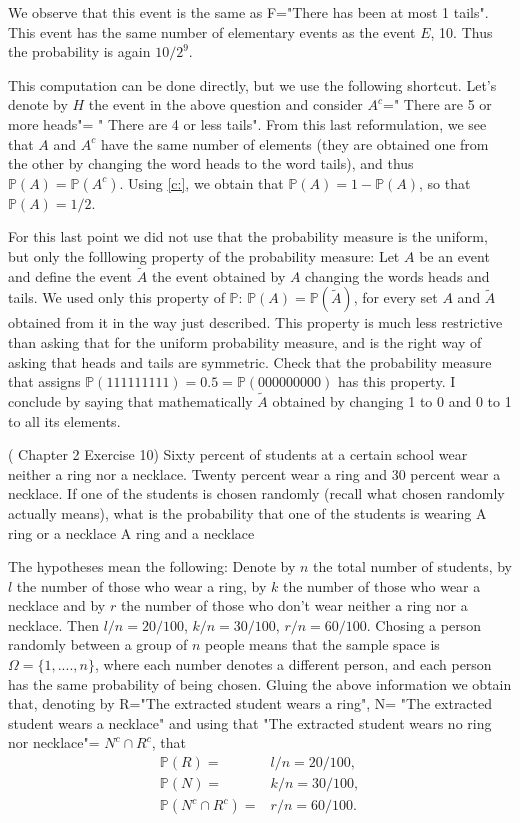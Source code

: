 \documentclass[12pt]{article}
\newcommand{\<}{{\langle \!\! \langle}}
\renewcommand{\>}{{\rangle \!\! \rangle}}
\newcommand{\bel}[2]{\begin{equation} \label{#1} \begin{split} #2
 					\end{split} \end{equation}}
\newcommand{\commento}[1]{
	\par\noindent
	\colorbox{light}{\begin{minipage}{120 mm}#1\end{minipage}}
	\par\noindent
}
\begin{document}
\begin{ExerciseList}
		\Question We observe that this event is the same as F="There has been at most 1 tails". This event has the same number of elementary events as the event $E$, 10. Thus the probability is again $10/2^9$.

		\Question This computation can be done directly, but we use the following shortcut. Let's denote by $H$ the event in the above question and consider $A^c$=" There are 5 or more heads"= " There are 4 or less tails". From this last reformulation, we see that $A$ and $A^c$ have the same number of elements (they are obtained one from the other by changing the word heads to the word tails), and thus $\mathbb{P}(A)=\mathbb{P}(A^c)$. Using \eqref{c:}, we obtain that $\mathbb{P}(A)=1-\mathbb{P}(A)$, so that $\mathbb{P}(A)=1/2$. 

		\commento{For this last point we did not use that the probability measure is the uniform, but only the folllowing property of the probability measure: 
		Let $A$ be an event and define the event $\tilde{A}$ the event obtained by $A$ changing the words heads and tails. We used only this property of $\mathbb{P}$: $\mathbb{P}(A)=\mathbb{P}(\tilde{A})$, for every set $A$ and $\tilde{A}$ obtained from it in the way just described. This property is much less restrictive than asking that for the uniform probability measure, and is the right way of asking that heads and tails are symmetric. Check that the probability measure that assigns $\mathbb{P}(111111111)=0.5=\mathbb{P}(000000000)$ has this property.
		I conclude by saying that mathematically $\tilde{A}$ obtained by changing 1 to 0 and 0 to 1 to all its elements. }




	\Exercise (\cite{Ross} Chapter 2 Exercise 10) Sixty percent of students at a certain school wear neither a ring nor a necklace. Twenty percent wear a ring and 30 percent wear a necklace. If one of the students is chosen randomly (recall what chosen randomly actually means), what is the probability that one of the students is wearing 
\Question A ring or a necklace
\Question A ring and a necklace

	\Answer The hypotheses mean the following: Denote by $n$ the total number of students, by $ l$ the number of those who wear  a ring, by $k$ the number of those who wear a necklace and by $r$  the number of those who don't wear neither a ring nor a necklace. Then $l/n=20/100$, $k/n=30/100$, $r/n=60/100$. Chosing a person randomly between a group of $n$ people means that the sample space is $\Omega=\{1,....,n\}$, where each number denotes a different person, and each person has the same probability of being chosen. Gluing the above information we obtain that, denoting by R="The extracted student wears a ring", N= "The extracted student wears a necklace" and using that "The extracted student wears no ring nor necklace"= $ N^c \cap R^c$, that 
	\bel{}{ \mathbb{P}(R) = & l/n = 20/100,\\
		\mathbb{P}(N) = & k/n = 30/100, \\
		\mathbb{P}(N^c \cap R^c ) = & r/n = 60/100.}


\end{ExerciseList}
\end{document}
